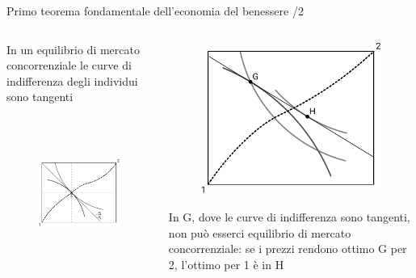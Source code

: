 \documentclass[aspectratio=64,11pt]{beamer}
\begin{document}
\begin{frame}{Primo teorema fondamentale dell’economia del benessere /2}
\begin{columns}
\begin{column}{.5\columnwidth}
In un equilibrio di mercato concorrenziale le curve di indifferenza degli individui sono tangenti

\begin{figure}[htbp]
\centering
\includegraphics[height=5cm]{./figure/edgeworth-4.pdf}
\end{figure}
\end{column}

\begin{column}{.5\columnwidth}
\begin{figure}[htbp]
\centering
\includegraphics[height=5cm]{./figure/edgeworth-5.pdf}
\end{figure}
\small
In G, dove le curve di indifferenza sono tangenti, non può esserci equilibrio di mercato concorrenziale: se i prezzi rendono ottimo G per 2, l’ottimo per 1 è in H
\end{column}
\end{columns}
\end{frame}
\end{document}
